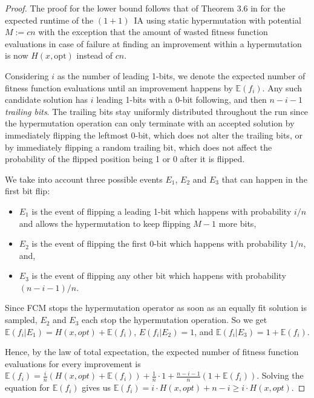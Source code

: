 \documentclass[lettersize,journal]{IEEEtran}
\newcommand{\EE}{\mathbb{E}}
\begin{document}
\begin{proof}

The proof for the lower bound follows that of Theorem 3.6 in \cite{CorusOlivetoYazdaniGECCO2017} for the expected runtime of the $(1+1)$~IA using static hypermutation with potential $M:=cn$ with the exception that the amount of wasted fitness function evaluations in case of failure at finding an improvement within a hypermutation is now $H(x,\text{opt})$ instead of $cn$.


Considering $i$ as the number of leading 1-bits, we denote the expected number of fitness function evaluations until an improvement happens by $\EE(f_i)$. Any such candidate solution has $i$ leading 1-bits with a 0-bit following, and then $n-i-1$ \emph{trailing bits}. The trailing bits stay uniformly distributed throughout the run since the hypermutation operation can only terminate with an accepted solution by immediately flipping the leftmost $0$-bit, which does not alter the trailing bits, or by immediately flipping a random trailing bit, which does not affect the probability of the flipped position being 1 or 0 after it is flipped\cite{DrosteJansenWegener2002}.  

 We take into account three possible events $E_1$, $E_2$ and $E_3$ that can happen in the first bit flip: 
 \begin{itemize}
\item $E_1$ is the event of flipping a leading 1-bit which happens with probability $i/n$ {\color{black} and allows the hypermutation to keep flipping $M-1$ more bits}, 
\item $E_2$ is the event of flipping the first 0-bit which happens with probability $1/n$, and, 
\item $E_3$ is the event of flipping any other bit which happens with probability $(n-i-1)/n$. 
\end{itemize}
{\color{black}Since FCM stops the hypermutation operator as soon as an equally fit solution is sampled, $E_2$ and $E_3$ each stop the hypermutation operation.} So we get $\EE(f_i|E_1)=H(x,opt)+ \EE(f_i)$, $E(f_i|E_2)=1$, and $\EE(f_i|E_3)=1+ \EE(f_i)$. 

Hence, by the law of total expectation, the expected number of fitness function evaluations for every improvement is $ \EE(f_i) = \frac{i}{n} \left( H(x,opt)+ \EE(f_i)\right) + \frac{1}{n} \cdot 1 +\frac{n-i-1}{n} \left( 1+ \EE(f_i)\right)$. Solving the equation for $\EE(f_i)$ gives us $\EE(f_i)=
i\cdot H(x,opt)+n-i\geq i\cdot H(x,opt) $. 


\end{proof}
\end{document}
